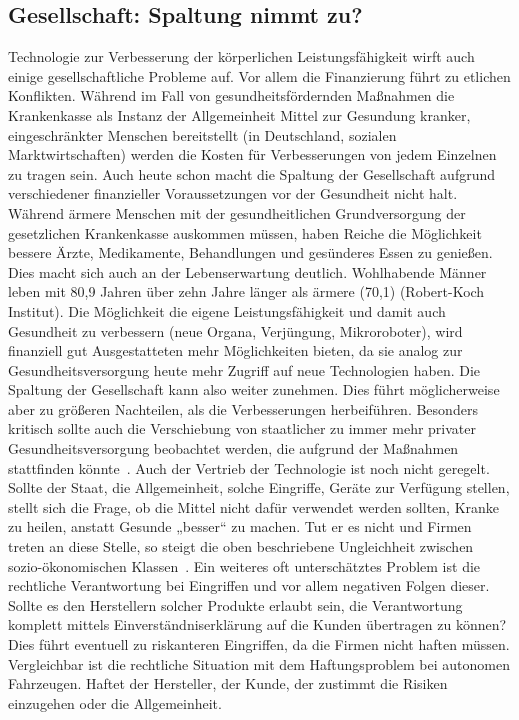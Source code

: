 \documentclass[a4paper,
DIV=13,
12pt,
BCOR=10mm,
department=FakEI,
twoside,
parskip=half,
automark,
]{OTHRartcl}
\begin{document}
\subsection*{Gesellschaft: Spaltung nimmt zu?}
Technologie zur Verbesserung der körperlichen Leistungsfähigkeit wirft auch einige gesellschaftliche Probleme auf. Vor allem die Finanzierung führt zu etlichen Konflikten. Während im Fall von gesundheitsfördernden Maßnahmen die Krankenkasse als
Instanz der Allgemeinheit Mittel zur Gesundung kranker, eingeschränkter Menschen bereitstellt (in Deutschland, sozialen Marktwirtschaften) werden die Kosten für Verbesserungen von jedem Einzelnen zu tragen sein. Auch heute schon macht die Spaltung der
Gesellschaft aufgrund verschiedener finanzieller Voraussetzungen vor der Gesundheit nicht halt. Während ärmere Menschen mit der gesundheitlichen Grundversorgung der gesetzlichen Krankenkasse auskommen müssen, haben Reiche die Möglichkeit bessere Ärzte, Medikamente,
Behandlungen und gesünderes Essen zu genießen. Dies macht sich auch an der Lebenserwartung deutlich. Wohlhabende Männer leben mit 80,9 Jahren über zehn Jahre länger als ärmere (70,1) (Robert-Koch Institut). Die Möglichkeit die eigene Leistungsfähigkeit und damit
auch Gesundheit zu verbessern (neue Organa, Verjüngung, Mikroroboter), wird finanziell gut Ausgestatteten mehr Möglichkeiten bieten, da sie analog zur Gesundheitsversorgung heute mehr Zugriff auf neue Technologien haben. Die Spaltung der Gesellschaft kann also weiter
zunehmen. Dies führt möglicherweise aber zu größeren Nachteilen, als die Verbesserungen herbeiführen. Besonders kritisch sollte auch die Verschiebung von staatlicher zu immer mehr privater Gesundheitsversorgung beobachtet werden, die aufgrund der Maßnahmen stattfinden
könnte~\cite{Kahn, Aziz 2009 S.7}. Auch der Vertrieb der Technologie ist noch nicht geregelt. Sollte der Staat, die Allgemeinheit, solche Eingriffe, Geräte zur Verfügung stellen, stellt sich die Frage, ob die Mittel nicht dafür verwendet werden sollten, Kranke zu heilen, anstatt
Gesunde „besser“ zu machen. Tut er es nicht und Firmen treten an diese Stelle, so steigt die oben beschriebene Ungleichheit zwischen sozio-ökonomischen Klassen~\cite{khan_aziz_2019}. Ein weiteres oft unterschätztes Problem ist die rechtliche Verantwortung bei Eingriffen und
vor allem negativen Folgen dieser. Sollte es den Herstellern solcher Produkte erlaubt sein, die Verantwortung komplett mittels Einverständniserklärung auf die Kunden übertragen zu können? Dies führt eventuell zu riskanteren Eingriffen, da die Firmen nicht haften müssen.
Vergleichbar ist die rechtliche Situation mit dem Haftungsproblem bei autonomen Fahrzeugen. Haftet der Hersteller, der Kunde, der zustimmt die Risiken einzugehen oder die Allgemeinheit.
\end{document}
